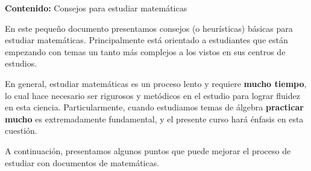 {\Large\textbf{Contenido:} Consejos para estudiar matemáticas}

En este pequeño documento presentamos consejos (o heurísticas) básicas para estudiar matemáticas.
Principalmente está orientado a estudiantes que están empezando con temas un tanto más complejos a los vistos en sus centros de estudios.

En general, estudiar matemáticas es un proceso lento y requiere \textbf{mucho tiempo}, lo cual hace necesario ser rigurosos y metódicos en el estudio para lograr fluidez en esta ciencia.
Particularmente, cuando estudiamos temas de álgebra \textbf{practicar mucho} es extremadamente fundamental, y el presente curso hará énfasis en esta cuestión.

A continuación, presentamos algunos puntos que puede mejorar el proceso de estudiar con documentos de matemáticas.

